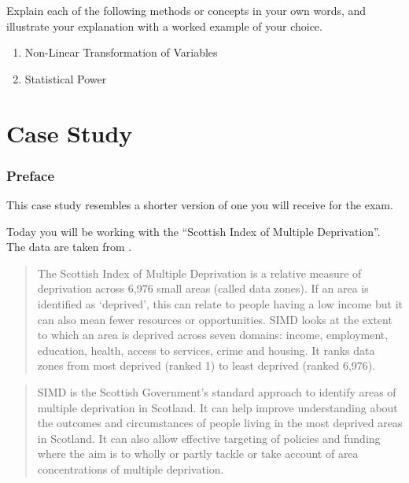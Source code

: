 \documentclass[12pt,a4paper]{article}
\begin{document}
\vspace{1cm}

Explain each of the following methods or concepts in your own words, and
illustrate your explanation with a worked example of your choice.

\vspace{1em}

\begin{enumerate}
\def\labelenumi{\arabic{enumi}.}
\item
  Non-Linear Transformation of Variables
\item
  Statistical Power
\end{enumerate}

\newpage

\part{Case Study}\label{part:case}

\section{Preface}\label{preface}

This case study resembles a shorter version of one you will receive for
the exam.

Today you will be working with the ``Scottish Index of Multiple
Deprivation''. The data are taken from \citet{simd:2020}.

\begin{quote}
The Scottish Index of Multiple Deprivation is a relative measure of
deprivation across 6,976 small areas (called data zones). If an area is
identified as `deprived', this can relate to people having a low income
but it can also mean fewer resources or opportunities. SIMD looks at the
extent to which an area is deprived across seven domains: income,
employment, education, health, access to services, crime and housing. It
ranks data zones from most deprived (ranked 1) to least deprived (ranked
6,976).
\end{quote}

\begin{quote}
SIMD is the Scottish Government's standard approach to identify areas of
multiple deprivation in Scotland. It can help improve understanding
about the outcomes and circumstances of people living in the most
deprived areas in Scotland. It can also allow effective targeting of
policies and funding where the aim is to wholly or partly tackle or take
account of area concentrations of multiple deprivation.
\end{quote}
\end{document}
